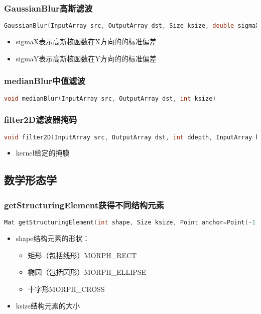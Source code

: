 \documentclass[12pt]{article}
\begin{document}
\subsubsection{GaussianBlur高斯滤波}
\begin{lstlisting}[language=c++]
GaussianBlur(InputArray src, OutputArray dst, Size ksize, double sigmaX, double sigmaY=0, int borderType=BORDER_DEFAULT )
\end{lstlisting}
	\begin{itemize}
	\item sigmaX表示高斯核函数在X方向的的标准偏差
	\item sigmaY表示高斯核函数在Y方向的的标准偏差
	\end{itemize}

\subsubsection{medianBlur中值滤波}
\begin{lstlisting}[language=c++]
void medianBlur(InputArray src, OutputArray dst, int ksize)
\end{lstlisting}

\subsubsection{filter2D滤波器掩码}
\begin{lstlisting}[language=c++]
void filter2D(InputArray src, OutputArray dst, int ddepth, InputArray kernel, Point anchor=Point(-1,-1), double delta=0, int borderType=BORDER_DEFAULT )
\end{lstlisting}
	\begin{itemize}
	\item kernel给定的掩膜
	\end{itemize}


\subsection{数学形态学}

\subsubsection{getStructuringElement获得不同结构元素}
\begin{lstlisting}[language=c++]
Mat getStructuringElement(int shape, Size ksize, Point anchor=Point(-1,-1))
\end{lstlisting}
\begin{itemize}
\item shape结构元素的形状：
	\begin{itemize}
	\item 矩形（包括线形）MORPH\_RECT
	\item 椭圆（包括圆形）MORPH\_ELLIPSE
	\item 十字形MORPH\_CROSS\\
	\end{itemize}
\item ksize结构元素的大小
\end{itemize}
\end{document}
